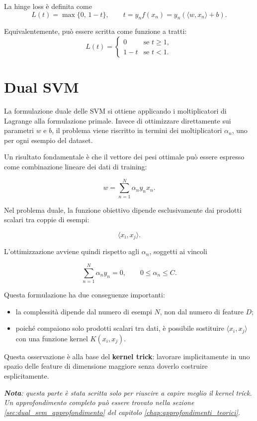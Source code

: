 La hinge loss è definita come
\[
L(t) = \max\{0,\, 1-t\},
\qquad
t = y_n f(x_n) = y_n(\langle w, x_n \rangle + b).
\]

Equivalentemente, può essere scritta come funzione a tratti:
\[
L(t)=
\begin{cases}
0 & \text{se } t \ge 1,\\
1-t & \text{se } t < 1.
\end{cases}
\]

\section{Dual SVM}\label{sec:dual_svm}

La formulazione duale delle SVM si ottiene applicando i moltiplicatori
di Lagrange alla formulazione primale. Invece di ottimizzare
direttamente sui parametri $w$ e $b$, il problema viene riscritto
in termini dei moltiplicatori $\alpha_n$, uno per ogni esempio
del dataset.

Un risultato fondamentale è che il vettore dei pesi ottimale può
essere espresso come combinazione lineare dei dati di training:

\[
w = \sum_{n=1}^{N} \alpha_n y_n x_n.
\]

Nel problema duale, la funzione obiettivo dipende esclusivamente
dai prodotti scalari tra coppie di esempi:

\[
\langle x_i, x_j \rangle.
\]

L'ottimizzazione avviene quindi rispetto agli $\alpha_n$,
soggetti ai vincoli

\[
\sum_{n=1}^{N} \alpha_n y_n = 0,
\qquad
0 \le \alpha_n \le C.
\]

Questa formulazione ha due conseguenze importanti:
\begin{itemize}
    \item la complessità dipende dal numero di esempi $N$,
    non dal numero di feature $D$;
    \item poiché compaiono solo prodotti scalari tra dati,
    è possibile sostituire $\langle x_i, x_j \rangle$
    con una funzione kernel $K(x_i, x_j)$.
\end{itemize}

Questa osservazione è alla base del \textbf{kernel trick}:
lavorare implicitamente in uno spazio delle feature di dimensione
maggiore senza doverlo costruire esplicitamente.

\bigskip
\noindent
\textit{\textbf{Nota}: questa parte è stata scritta solo per riuscire a capire meglio il kernel trick. Un approfondimento completo può essere trovato nella sezione \ref{sec:dual_svm_approfondimento} del capitolo \ref{chap:approfondimenti_teorici}.}

